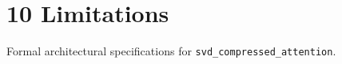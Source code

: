 \section{10 Limitations}

Formal architectural specifications for \texttt{svd_compressed_attention}.
